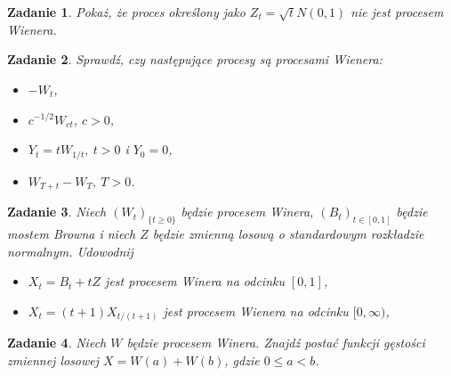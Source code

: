 \documentclass{mwart}
\newtheorem{zd}{Zadanie}
\begin{document}
\begin{zd}
	Pokaż, że proces określony jako $Z_t = \sqrt{t}N(0,1)$ nie jest procesem Wienera.
\end{zd}

\begin{zd}
	Sprawdź, czy następujące procesy są procesami Wienera:
	\begin{itemize}
		\item $-W_t$,
		\item $c^{-1/2}W_{ct}$, $c>0$,
		\item $Y_t = tW_{1/t},\ t> 0$ i $Y_0 = 0$,
		\item $W_{T+t} - W_T, \ T > 0$.
	\end{itemize}
\end{zd}

\begin{zd}
Niech $(W_t)_{\{t \geq 0\}}$ będzie procesem Winera, $(B_t)_{t\in [0, 1]}$ będzie mostem Browna i niech $Z$ będzie zmienną losową o standardowym rozkładzie normalnym. Udowodnij
\begin{itemize}
\item $X_t = B_t+tZ$ jest procesem Winera na odcinku $[0, 1]$,
\item $X_t = (t+1)X_{t/(t+1)}$ jest procesem Wienera na odcinku $[0, \infty)$,
\end{itemize}
\end{zd}

\begin{zd}
Niech $W$ będzie procesem Winera. Znajdź postać funkcji gęstości zmiennej losowej $X = W(a) + W(b)$, gdzie $0 \leq a < b$.
\end{zd}
\end{document}
